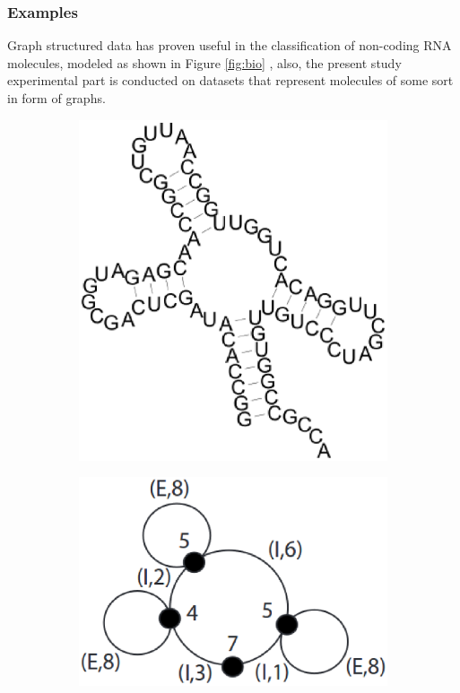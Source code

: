 \subsubsection{Examples}
\label{subsubsec:examples}

Graph structured data has proven useful in the classification of non-coding RNA
molecules, modeled as shown in Figure \ref{fig:bio} \cite{nnavarin, conf/psb/KarklinMH05},
also, the present study experimental part is conducted on datasets that represent
molecules of some sort in form of graphs.

\begin{figure}[ht]
    \centering
    \begin{subfigure}{.4\textwidth}
        \centering
        \includegraphics[width=\linewidth]{Figures/rna}
        \label{fig:rna}
        \caption{}
    \end{subfigure}
    \begin{subfigure}{.4\textwidth}
        \centering
        \includegraphics[width=\linewidth]{Figures/ldgrna}

\end{subfigure}
\end{figure}
